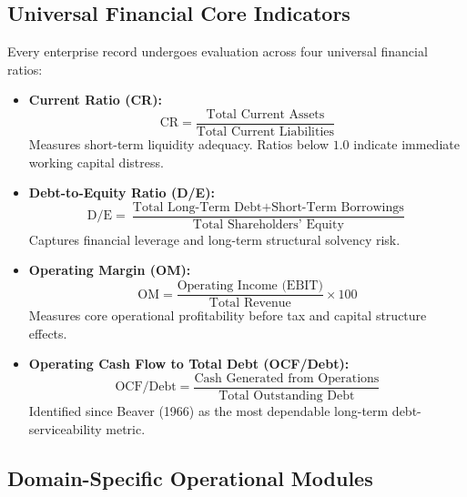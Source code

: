 \documentclass[11pt, a4paper]{article}
\begin{document}
\subsection{Universal Financial Core Indicators}
Every enterprise record undergoes evaluation across four universal financial ratios:
\begin{itemize}
    \item \textbf{Current Ratio (CR):}
    \begin{equation}
        \text{CR} = \frac{\text{Total Current Assets}}{\text{Total Current Liabilities}}
    \end{equation}
    Measures short-term liquidity adequacy. Ratios below $1.0$ indicate immediate working capital distress.
    
    \item \textbf{Debt-to-Equity Ratio (D/E):}
    \begin{equation}
        \text{D/E} = \frac{\text{Total Long-Term Debt} + \text{Short-Term Borrowings}}{\text{Total Shareholders' Equity}}
    \end{equation}
    Captures financial leverage and long-term structural solvency risk.
    
    \item \textbf{Operating Margin (OM):}
    \begin{equation}
        \text{OM} = \frac{\text{Operating Income (EBIT)}}{\text{Total Revenue}} \times 100
    \end{equation}
    Measures core operational profitability before tax and capital structure effects.
    
    \item \textbf{Operating Cash Flow to Total Debt (OCF/Debt):}
    \begin{equation}
        \text{OCF/Debt} = \frac{\text{Cash Generated from Operations}}{\text{Total Outstanding Debt}}
    \end{equation}
    Identified since Beaver (1966) as the most dependable long-term debt-serviceability metric.
\end{itemize}

\subsection{Domain-Specific Operational Modules}
\end{document}
